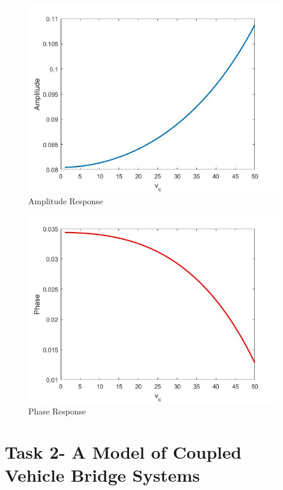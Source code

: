 \documentclass[11pt, oneside]{article}   	%
\begin{document}
\begin{figure}[!htbp]
\centering
  \includegraphics[scale=0.45]{AmplResponse}
  \caption{Amplitude Response}
\end{figure}
\begin{figure}[!htbp]
  \centering
  \includegraphics[scale=0.45]{PhResponse}
  \caption{Phase Response}
\end{figure}

\pagebreak
\section{Task 2- A Model of Coupled Vehicle Bridge Systems}
\end{document}
